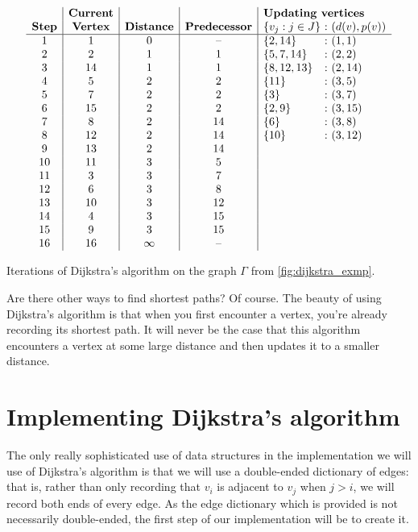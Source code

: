 \documentclass[m3380-lec-main.tex]{subfiles}
\begin{document}
\begin{table}[hbt]{\fn
\[\begin{array}{c|c|c|c|l@{~:~}l}
& \textbf{Current} &&& \multicolumn{2}{l}{\textbf{Updating vertices}} \\
\textbf{Step} & \textbf{Vertex} & \textbf{Distance} &\textbf{Predecessor} & \set{v_j:j\in J} & (d(v), p(v)) \\ \hline
1 & 1 & 0 & \text{--} & \set{2, 14} & (1,1) \\
2 & 2 & 1 & 1 & \set{5, 7, 14} & (2,2) \\
3 & 14 & 1 & 1 & \set{8, 12, 13} & (2,14) \\
4 & 5 & 2 & 2 & \set{11} & (3,5) \\
5 & 7 & 2 & 2 & \set{3} & (3,7) \\
6 & 15 & 2 & 2 & \set{2, 9} & (3, 15) \\
7 & 8 & 2 & 14 & \set{6} & (3,8) \\
8 & 12 & 2 & 14 & \set{10} & (3,12) \\
9 & 13 & 2 & 14 \\
10 & 11 & 3 & 5 \\
11 & 3 & 3 & 7 \\
12 & 6 & 3 & 8 \\
13 & 10 & 3 & 12 \\
14 & 4 & 3 & 15 \\
15 & 9 & 3 & 15 \\
16 & 16 & \infty & \text{--}
\end{array}\]}
\caption{\label{tab:dijkstra_exmp} Iterations of Dijkstra's algorithm on the graph $\Gamma$ from \autoref{fig:dijkstra_exmp}.}
\end{table}

Are there other ways to find shortest paths? Of course. The beauty of using Dijkstra's algorithm is that when you first encounter a vertex, you're already recording its shortest path. It will never be the case that this algorithm encounters a vertex at some large distance and then updates it to a smaller distance.


\section{Implementing Dijkstra's algorithm}
The only really sophisticated use of data structures in the implementation we will use of Dijkstra's algorithm is that we will use a double-ended dictionary of edges: that is, rather than only recording that $v_i$ is adjacent to $v_j$ when $j>i$, we will record both ends of every edge. As the edge dictionary which is provided is not necessarily double-ended, the first step of our implementation will be to create it.
\end{document}
